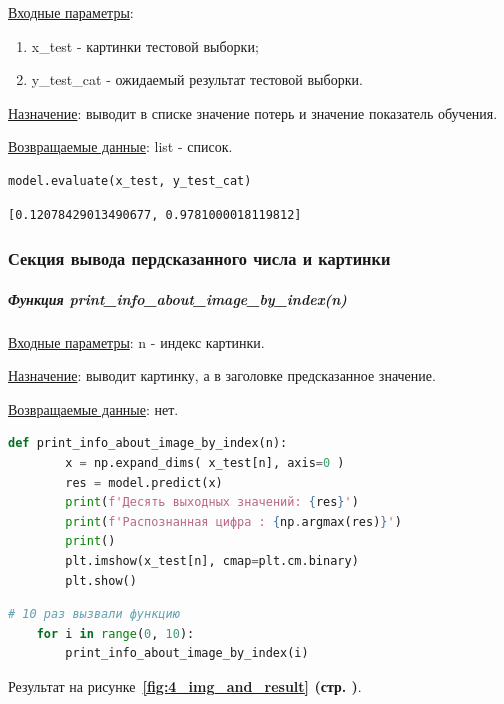 \underline{Входные параметры}:
\begin{enumerate}
    \item x\_test - картинки тестовой выборки;
    \item y\_test\_cat - ожидаемый результат тестовой выборки.
\end{enumerate}

\underline{Назначение}: выводит в списке значение потерь и значение показатель обучения.

\underline{Возвращаемые данные}: list - список.

\begin{lstlisting}[language=Python,]
    model.evaluate(x_test, y_test_cat)
\end{lstlisting}

\begin{lstlisting}[name=Вывод в консоль,]
    [0.12078429013490677, 0.9781000018119812]
\end{lstlisting}



\subsubsection{Секция вывода пердсказанного числа и картинки}

\subparagraph{Функция print\_info\_about\_image\_by\_index(n)} \hspace{0pt}

\underline{Входные параметры}: n - индекс картинки.

\underline{Назначение}: выводит картинку, а в заголовке предсказанное значение.

\underline{Возвращаемые данные}: нет.

\begin{lstlisting}[language=Python,]
    def print_info_about_image_by_index(n):
        x = np.expand_dims( x_test[n], axis=0 )
        res = model.predict(x)
        print(f'Десять выходных значений: {res}')
        print(f'Распознанная цифра : {np.argmax(res)}')
        print()
        plt.imshow(x_test[n], cmap=plt.cm.binary)
        plt.show()
\end{lstlisting}

\begin{lstlisting}[language=Python,]
    # 10 раз вызвали функцию
    for i in range(0, 10):
        print_info_about_image_by_index(i)
\end{lstlisting}

Результат на
рисунке~\textbf{\ref{fig:4_img_and_result} (стр. \pageref{fig:4_img_and_result})}.

